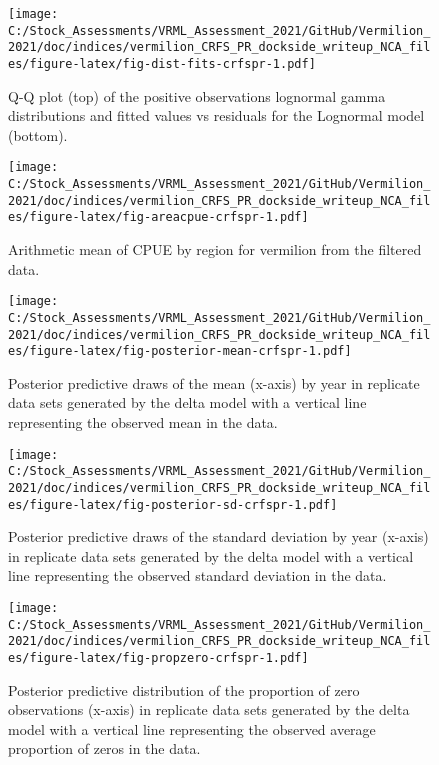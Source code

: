 \documentclass[
]{article}
\begin{document}
\FloatBarrier

\begin{figure}
\centering
\texttt{[image: C:/Stock\_Assessments/VRML\_Assessment\_2021/GitHub/Vermilion\_2021/doc/indices/vermilion\_CRFS\_PR\_dockside\_writeup\_NCA\_files/figure-latex/fig-dist-fits-crfspr-1.pdf]}
\caption{\label{fig:fig-dist-fits-crfspr}Q-Q plot (top) of the positive observations lognormal gamma distributions and fitted values vs residuals for the Lognormal model (bottom).}
\end{figure}

\begin{figure}
\centering
\texttt{[image: C:/Stock\_Assessments/VRML\_Assessment\_2021/GitHub/Vermilion\_2021/doc/indices/vermilion\_CRFS\_PR\_dockside\_writeup\_NCA\_files/figure-latex/fig-areacpue-crfspr-1.pdf]}
\caption{\label{fig:fig-areacpue-crfspr}Arithmetic mean of CPUE by region for vermilion from the filtered data.}
\end{figure}

\begin{figure}
\centering
\texttt{[image: C:/Stock\_Assessments/VRML\_Assessment\_2021/GitHub/Vermilion\_2021/doc/indices/vermilion\_CRFS\_PR\_dockside\_writeup\_NCA\_files/figure-latex/fig-posterior-mean-crfspr-1.pdf]}
\caption{\label{fig:fig-posterior-mean-crfspr}Posterior predictive draws of the mean (x-axis) by year in replicate data sets generated by the delta model with a vertical line representing the observed mean in the data.}
\end{figure}

\FloatBarrier

\begin{figure}
\centering
\texttt{[image: C:/Stock\_Assessments/VRML\_Assessment\_2021/GitHub/Vermilion\_2021/doc/indices/vermilion\_CRFS\_PR\_dockside\_writeup\_NCA\_files/figure-latex/fig-posterior-sd-crfspr-1.pdf]}
\caption{\label{fig:fig-posterior-sd-crfspr}Posterior predictive draws of the standard deviation by year (x-axis) in replicate data sets generated by the delta model with a vertical line representing the observed standard deviation in the data.}
\end{figure}

\begin{figure}
\centering
\texttt{[image: C:/Stock\_Assessments/VRML\_Assessment\_2021/GitHub/Vermilion\_2021/doc/indices/vermilion\_CRFS\_PR\_dockside\_writeup\_NCA\_files/figure-latex/fig-propzero-crfspr-1.pdf]}
\caption{\label{fig:fig-propzero-crfspr}Posterior predictive distribution of the proportion of zero observations (x-axis) in replicate data sets generated by the delta model with a vertical line representing the observed average proportion of zeros in the data.}
\end{figure}
\end{document}
